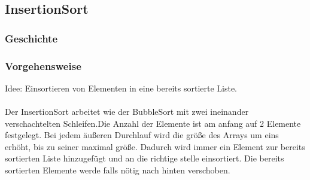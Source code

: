 \documentclass{article}
\begin{document}

\subsection{InsertionSort}
\subsubsection{Geschichte}

\subsubsection{Vorgehensweise}
Idee: Einsortieren von Elementen in eine bereits sortierte Liste. \\ \\
Der InsertionSort arbeitet wie der BubbleSort mit zwei ineinander verschachtelten Schleifen.Die Anzahl der Elemente ist am anfang auf 2 Elemente festgelegt. Bei jedem äußeren Durchlauf wird die größe des Arrays um eins erhöht, bis zu seiner maximal größe. Dadurch wird immer ein Element zur bereits sortierten Liste hinzugefügt und an die richtige stelle einsortiert. Die bereits sortierten Elemente werde falls nötig nach hinten verschoben.
\end{document}
